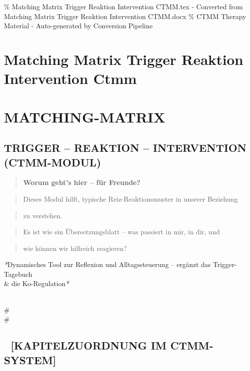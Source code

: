 \% Matching Matrix Trigger Reaktion Intervention CTMM.tex - Converted from Matching Matrix Trigger Reaktion Intervention CTMM.docx
\% CTMM Therapy Material - Auto-generated by Conversion Pipeline

\section{Matching Matrix Trigger Reaktion Intervention Ctmm}
\label{sec:matching-matrix-trigger-reaktion-intervention-ctmm}

\section{\textcolor{ctmmBlue}{\faPuzzlePiece} \textbf{MATCHING-MATRIX}}
\subsection{\textbf{TRIGGER -- REAKTION -- INTERVENTION (\textcolor{ctmmBlue}{CTMM}-MODUL)}}

\begin{quote}
\textcolor{ctmmPurple}{\faBrain} \textbf{Worum geht's hier -- für Freunde?}\
\end{quote}
\begin{quote}
Dieses Modul hilft, typische Reiz-Reaktionsmuster in unserer Beziehung
\end{quote}
\begin{quote}
zu verstehen.\
\end{quote}
\begin{quote}
Es ist wie ein Übersetzungsblatt -- was passiert in mir, in dir, und
\end{quote}
\begin{quote}
wie können wir hilfreich reagieren?
\end{quote}

\textcolor{ctmmBlue}{\faPuzzlePiece} \textit{*}Dynamisches Tool zur Reflexion und Alltagssteuerung -- ergänzt das
\textcolor{ctmmRed}{Trigger}-Tagebuch \\& die Ko-Regulation\textit{*}

\\#\\#

\subsection{📘 \textbf{[KAPITELZUORDNUNG IM \textcolor{ctmmBlue}{CTMM}-SYSTEM]}}

